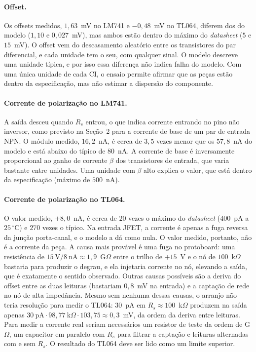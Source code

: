 \documentclass[11pt,a4paper]{article}
\begin{document}
\paragraph{Offset.} Os offsets medidos, $1{,}63$~mV no LM741 e $-0{,}48$~mV no TL064, diferem dos
do modelo ($1{,}10$ e $0{,}027$~mV), mas ambos estão dentro do máximo do \textit{datasheet}
($5$ e $15$~mV). O offset vem do descasamento aleatório entre os transistores do par diferencial, e
cada unidade tem o seu, com qualquer sinal. O modelo descreve uma unidade típica, e por isso essa
diferença não indica falha do modelo. Com uma única unidade de cada CI, o ensaio permite afirmar que
as peças estão dentro da especificação, mas não estimar a dispersão do componente.

\paragraph{Corrente de polarização no LM741.} A saída desceu quando $R_s$ entrou, o que indica
corrente entrando no pino não inversor, como previsto na Seção~2 para a corrente de base de um par
de entrada NPN. O módulo medido, $16{,}2$~nA, é cerca de $3{,}5$ vezes menor que os $57{,}8$~nA do
modelo e está abaixo do típico de $80$~nA. A corrente de base é inversamente proporcional ao ganho
de corrente $\beta$ dos transistores de entrada, que varia bastante entre unidades. Uma unidade
com $\beta$ alto explica o valor, que está dentro da especificação (máximo de $500$~nA).

\paragraph{Corrente de polarização no TL064.} O valor medido, $+8{,}0$~nA, é cerca de $20$ vezes
o máximo do \textit{datasheet} ($400$~pA a $25\,^\circ$C) e $270$ vezes o típico. Na entrada JFET,
a corrente é apenas a fuga reversa da junção porta-canal, e o modelo a dá como nula. O valor
medido, portanto, não é a corrente da peça. A causa mais provável é uma fuga no protoboard: uma
resistência de $15~\text{V}/8~\text{nA}\approx1{,}9$~G$\Omega$ entre o trilho de $+15$~V e o nó de
$100$~k$\Omega$ bastaria para produzir o degrau, e ela injetaria corrente no nó, elevando a saída,
que é exatamente o sentido observado. Outras causas possíveis são a deriva do offset entre as duas
leituras (bastariam $0{,}8$~mV na entrada) e a captação de rede no nó de alta impedância. Mesmo sem
nenhuma dessas causas, o arranjo não teria resolução para medir o TL064: $30$~pA em
$R_s\approx100$~k$\Omega$ produzem na saída apenas
$30~\text{pA}\cdot98{,}77~\text{k}\Omega\cdot103{,}75\approx0{,}3$~mV, da ordem da deriva entre
leituras. Para medir a corrente real seriam necessários um resistor de teste da ordem de
G$\Omega$, um capacitor em paralelo com $R_s$ para filtrar a captação e leituras alternadas com e
sem $R_s$. O resultado do TL064 deve ser lido como um limite superior.
\end{document}
